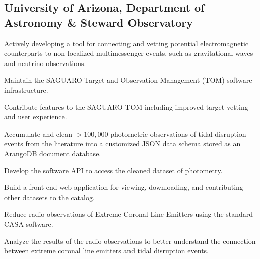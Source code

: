 \documentclass[a4paper, 12pt]{article}
\begin{document}
\subsection {{University of Arizona, Department of Astronomy \& Steward Observatory}}

\vspace*{5pt}
\begin{zitemize}
    \item Actively developing a tool for connecting and vetting potential electromagnetic counterparts to non-localized multimessenger events, such as gravitational waves and neutrino observations.
\end{zitemize}

\vspace*{5pt}
\begin{zitemize}
    \item Maintain the SAGUARO Target and Observation Management (TOM) software infrastructure.
    \item Contribute features to the SAGUARO TOM including improved target vetting and user experience.
\end{zitemize}

\vspace*{5pt}
\begin{zitemize}
    \item Accumulate and clean $>100,000$ photometric observations of tidal disruption events from the literature into a customized JSON data schema stored as an ArangoDB document database.
    \item Develop the software API to access the cleaned dataset of photometry.
    \item Build a front-end web application for viewing, downloading, and contributing other datasets to the catalog.
\end{zitemize}

\vspace*{5pt}
\begin{zitemize}
    \item Reduce radio observations of Extreme Coronal Line Emitters using the standard CASA software.
    \item Analyze the results of the radio observations to better understand the connection between extreme coronal line emitters and tidal disruption events.
\end{zitemize}
\vspace*{8pt}
\end{document}
